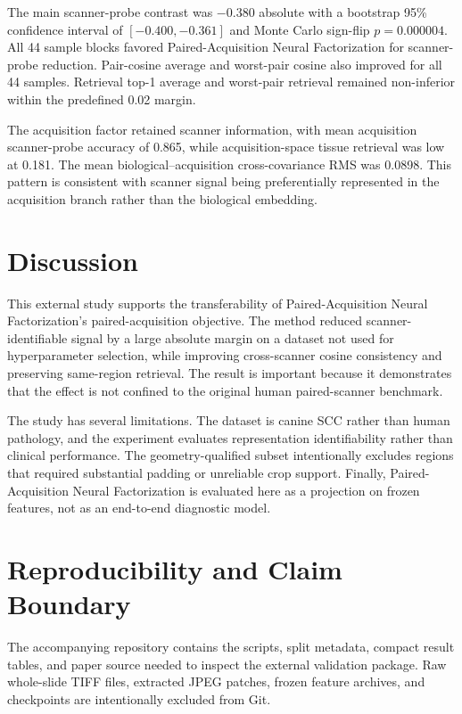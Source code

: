 \documentclass[10pt]{article}
\begin{document}
The main scanner-probe contrast was $-0.380$ absolute with a bootstrap 95\% confidence interval of $[-0.400, -0.361]$ and Monte Carlo sign-flip $p=0.000004$. All 44 sample blocks favored Paired-Acquisition Neural Factorization for scanner-probe reduction. Pair-cosine average and worst-pair cosine also improved for all 44 samples. Retrieval top-1 average and worst-pair retrieval remained non-inferior within the predefined 0.02 margin.

The acquisition factor retained scanner information, with mean acquisition scanner-probe accuracy of 0.865, while acquisition-space tissue retrieval was low at 0.181. The mean biological--acquisition cross-covariance RMS was 0.0898. This pattern is consistent with scanner signal being preferentially represented in the acquisition branch rather than the biological embedding.

\section{Discussion}

This external study supports the transferability of Paired-Acquisition Neural Factorization's paired-acquisition objective. The method reduced scanner-identifiable signal by a large absolute margin on a dataset not used for hyperparameter selection, while improving cross-scanner cosine consistency and preserving same-region retrieval. The result is important because it demonstrates that the effect is not confined to the original human paired-scanner benchmark.

The study has several limitations. The dataset is canine SCC rather than human pathology, and the experiment evaluates representation identifiability rather than clinical performance. The geometry-qualified subset intentionally excludes regions that required substantial padding or unreliable crop support. Finally, Paired-Acquisition Neural Factorization is evaluated here as a projection on frozen features, not as an end-to-end diagnostic model.

\section{Reproducibility and Claim Boundary}

The accompanying repository contains the scripts, split metadata, compact result tables, and paper source needed to inspect the external validation package. Raw whole-slide TIFF files, extracted JPEG patches, frozen feature archives, and checkpoints are intentionally excluded from Git.
\end{document}
